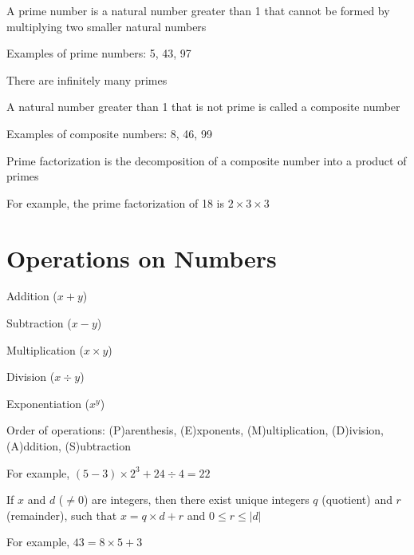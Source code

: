 \documentclass[8pt,a4paper,compress]{beamer}
\begin{document}
\begin{frame}[fragile]
\pause\transdissolve

A prime number is a natural number greater than 1 that cannot be formed by multiplying two smaller natural numbers

\pause\transdissolve\bigskip

Examples of prime numbers: 5, 43, 97

\pause\transdissolve\bigskip

There are infinitely many primes

\pause\transdissolve\bigskip

A natural number greater than 1 that is not prime is called a composite number

\pause\transdissolve\bigskip

Examples of composite numbers: 8, 46, 99

\pause\transdissolve\bigskip

Prime factorization is the decomposition of a composite number into a product of primes

\pause\transdissolve\bigskip

For example, the prime factorization of 18 is $2 \times 3 \times 3$
\end{frame}

\section{Operations on Numbers}
\begin{frame}[fragile]
\pause\transdissolve

Addition ($x + y$)

\pause\transdissolve\bigskip

Subtraction ($x - y$)

\pause\transdissolve\bigskip

Multiplication ($x \times y$)

\pause\transdissolve\bigskip

Division ($x \div y$)

\pause\transdissolve\bigskip

Exponentiation ($x^y$)

\pause\transdissolve\bigskip

Order of operations: (P)arenthesis, (E)xponents, (M)ultiplication, (D)ivision, (A)ddition, (S)ubtraction

\pause\transdissolve\bigskip

For example, $(5 - 3) \times 2^3 + 24 \div 4 = 22$

\pause\transdissolve\bigskip

If $x$ and $d$ ($\neq 0$) are integers, then there exist unique integers $q$ (quotient) and $r$ (remainder), such that $x = q \times d + r$ and $0 \leq r \leq |d|$

\pause\transdissolve\bigskip

For example, $43 = 8 \times 5 + 3$
\end{frame}
\end{document}

